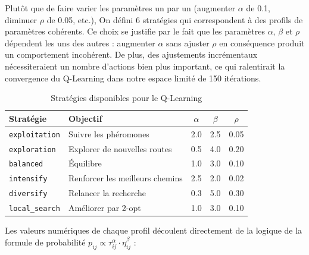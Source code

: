 \documentclass[12pt, a4paper]{article}
\begin{document}
Plutôt que de faire varier les paramètres un par un (augmenter $\alpha$ de 0.1, diminuer $\rho$ de 0.05, etc.), On défini 6 stratégies qui correspondent à des profils de paramètres cohérents. Ce choix se justifie par le fait que les paramètres $\alpha$, $\beta$ et $\rho$ dépendent les uns des autres : augmenter $\alpha$ sans ajuster $\rho$ en conséquence produit un comportement incohérent. De plus, des ajustements incrémentaux nécessiteraient un nombre d'actions bien plus important, ce qui ralentirait la convergence du Q-Learning dans notre espace limité de 150 itérations.

\begin{table}[H]
\centering
\caption{Stratégies disponibles pour le Q-Learning}
\label{tab:strategies}
\begin{tabular}{llccc}
\toprule
\textbf{Stratégie} & \textbf{Objectif} & $\alpha$ & $\beta$ & $\rho$ \\
\midrule
\texttt{exploitation} & Suivre les phéromones & 2.0 & 2.5 & 0.05 \\
\texttt{exploration} & Explorer de nouvelles routes & 0.5 & 4.0 & 0.20 \\
\texttt{balanced} & Équilibre & 1.0 & 3.0 & 0.10 \\
\texttt{intensify} & Renforcer les meilleurs chemins & 2.5 & 2.0 & 0.02 \\
\texttt{diversify} & Relancer la recherche & 0.3 & 5.0 & 0.30 \\
\texttt{local\_search} & Améliorer par 2-opt & 1.0 & 3.0 & 0.10 \\
\bottomrule
\end{tabular}
\end{table}

Les valeurs numériques de chaque profil découlent directement de la logique de la formule de probabilité $p_{ij} \propto \tau_{ij}^\alpha \cdot \eta_{ij}^\beta$ :
\end{document}
